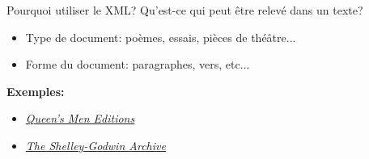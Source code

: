 \begin{frame}{Pourquoi utiliser le XML?}
Qu'est-ce qui peut être relevé dans un texte? \\
\pause 
\begin{itemize}
    \item Type de document: poèmes, essais, pièces de théâtre...
    \item Forme du document: paragraphes, vers, etc...
\end{itemize}
\textbf{Exemples:}
\begin{itemize}
    \item \href{https://lemdo.uvic.ca/qme\_editions/2.0/emdFV\_M.html}{\textit{Queen's Men Editions}}
    \item  \href{https://shelleygodwinarchive.org/sc/oxford/frankenstein/volume/i/\#/p1/mode/xml}{\textit{The Shelley-Godwin Archive}}
\end{itemize}
\end{frame}

